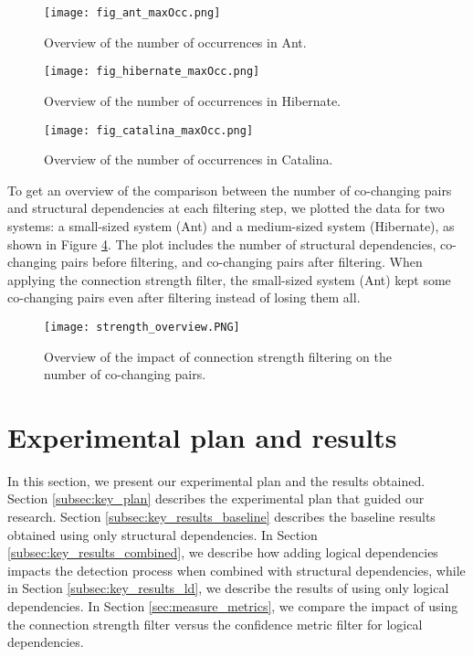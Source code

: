 \begin{figure}[H]
\centering
\texttt{[image: fig\_ant\_maxOcc.png]}
\caption{Overview of the number of occurrences in Ant. }
\label{fig:strength_overview_ant}
\centering
\end{figure}

\begin{figure}[H]
\centering
\texttt{[image: fig\_hibernate\_maxOcc.png]}
\caption{Overview of the number of occurrences in Hibernate. }
\label{fig:strength_overview_hibernate}
\centering
\end{figure}


\begin{figure}[H]
\centering
\texttt{[image: fig\_catalina\_maxOcc.png]}
\caption{Overview of the number of occurrences in Catalina. }
\label{fig:strength_overview_catalina}
\centering
\end{figure}

To get an overview of the comparison between the number of co-changing pairs and structural dependencies at each filtering step, we plotted the data for two systems: a small-sized system (Ant) and a medium-sized system (Hibernate), as shown in Figure \ref{fig:strength_overview}. The plot includes the number of structural dependencies, co-changing pairs before filtering, and co-changing pairs after filtering. When applying the connection strength filter, the small-sized system (Ant) kept some co-changing pairs even after filtering instead of losing them all.

\begin{figure}[H]
\centering
\texttt{[image: strength\_overview.PNG]}
\caption{Overview of the impact of connection strength filtering on the number of co-changing pairs. }
\label{fig:strength_overview}
\centering
\end{figure}

\section{Experimental plan and results}
\label{sec:key_plan_and_results}

\hspace{4em}In this section, we present our experimental plan and the results obtained. Section \ref{subsec:key_plan} describes the experimental plan that guided our research. Section \ref{subsec:key_results_baseline} describes the baseline results obtained using only structural dependencies. In Section \ref{subsec:key_results_combined}, we describe how adding logical dependencies impacts the detection process when combined with structural dependencies, while in Section \ref{subsec:key_results_ld}, we describe the results of using only logical dependencies. In Section \ref{sec:measure_metrics}, we compare the impact of using the connection strength filter versus the confidence metric filter for logical dependencies. 


